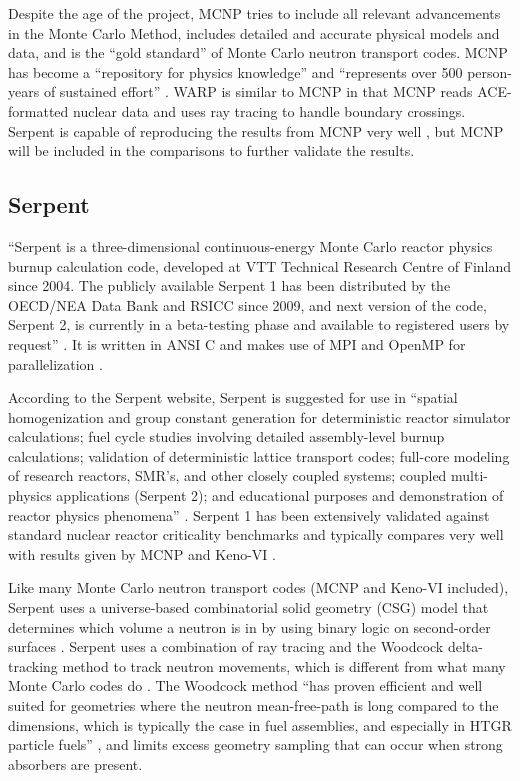 Despite the age of the project, MCNP tries to include all relevant advancements in the Monte Carlo Method, includes detailed and accurate physical models and data, and is the ``gold standard'' of Monte Carlo neutron transport codes.  MCNP has become a ``repository for physics knowledge'' and ``represents over 500 person-years of sustained effort'' \cite{mcnp}.   WARP is similar to MCNP in that MCNP reads ACE-formatted nuclear data and uses ray tracing to handle boundary crossings.  Serpent is capable of reproducing the results from MCNP very well \cite{jaakko}, but MCNP will be included in the comparisons to further validate the results.

\subsection{Serpent}

``Serpent is a three-dimensional continuous-energy Monte Carlo reactor physics burnup calculation code, developed at VTT Technical Research Centre of Finland since 2004. The publicly available Serpent 1 has been distributed by the OECD/NEA Data Bank and RSICC since 2009, and next version of the code, Serpent 2, is currently in a beta-testing phase and available to registered users by request'' \cite{serpent}.  It is written in ANSI C and makes use of MPI and OpenMP for parallelization \cite{jaakko}.

 According to the Serpent website, Serpent is suggested for use in ``spatial homogenization and group constant generation for deterministic reactor simulator calculations; fuel cycle studies involving detailed assembly-level burnup calculations; validation of deterministic lattice transport codes; full-core modeling of research reactors, SMR's, and other closely coupled systems; coupled multi-physics applications (Serpent 2);  and educational purposes and demonstration of reactor physics phenomena'' \cite{serpent}.  Serpent 1 has been extensively validated against standard nuclear reactor criticality benchmarks and typically compares very well with results given by MCNP and Keno-VI \cite{serpent}.

Like many Monte Carlo neutron transport codes (MCNP and Keno-VI included), Serpent uses a universe-based combinatorial solid geometry (CSG) model that determines which volume a neutron is in by using binary logic on second-order surfaces \cite{mcnp, serpent}.  Serpent uses a combination of ray tracing and the Woodcock delta-tracking method to track neutron movements, which is different from what many Monte Carlo codes do \cite{serpent}.  
The Woodcock method ``has proven efficient and well suited for geometries where the neutron mean-free-path is long compared to the dimensions, which is typically the case in fuel assemblies, and especially in HTGR particle fuels'' \cite{serpent}, and limits excess geometry sampling that can occur when strong absorbers are present.


